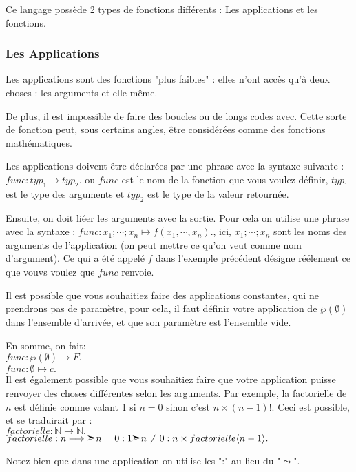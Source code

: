 \documentclass{article}
\begin{document}
Ce langage possède 2 types de fonctions différents : Les applications et les fonctions.

\subsubsection{Les Applications}

Les applications sont des fonctions "plus faibles" : elles n'ont accès qu'à deux choses : les arguments et elle-même.

De plus, il est impossible de faire des boucles ou de longs codes avec. Cette sorte de fonction peut, sous certains angles, être considérées comme des fonctions mathématiques.

Les applications doivent être déclarées par une phrase avec la syntaxe suivante : $func : typ_1 \longrightarrow typ_2.$ ou $func$ est le nom de la fonction que vous voulez définir,  $typ_1$ est le type des arguments et $typ_2$ est le type de la valeur retournée.

Ensuite, on doit liéer les arguments avec la sortie. Pour cela on utilise une phrase avec la syntaxe : $func : x_1;\dotsb;x_n \longmapsto f(x_1,\dotsb,x_n).$, ici, $x_1;\dotsb;x_n$ sont les noms des arguments de l'application (on peut mettre ce qu'on veut comme nom d'argument). Ce qui a été appelé $f$ dans l'exemple précédent désigne réélement ce que vouvs voulez que $func$ renvoie.

Il est possible que vous souhaitiez faire des applications constantes, qui ne prendrons pas de paramètre, pour cela, il faut définir votre application de $\wp(\emptyset)$ dans l'ensemble d'arrivée, et que son paramètre est l'ensemble vide.

En somme, on fait:\\
$func : \wp(\emptyset) \longrightarrow F.$\\
$func : \emptyset \longmapsto c.$\\

Il est également possible que vous souhaitiez faire que votre application puisse renvoyer des choses différentes selon les arguments. Par exemple, la factorielle de $n$ est définie comme valant 1 si $n=0$ sinon c'est $n \times (n-1)!$. Ceci est possible, et se traduirait par :\\
$factorielle : \mathbb{N} \longrightarrow \mathbb{N}.$\\
$factorielle : n \longmapsto \text{\ding{227}} n=0 : 1 \text{\ding{227}} n\neq 0 : n \times factorielle\langle n-1\rangle.$

Notez bien que dans une application on utilise les ":" au lieu du "$\leadsto$".
\end{document}
